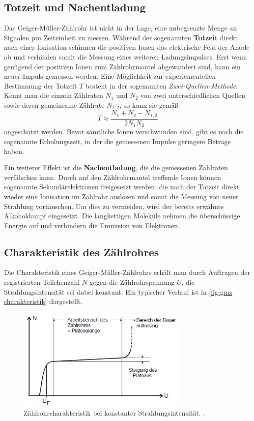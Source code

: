 \subsection{Totzeit und Nachentladung}
\label{sec:Totzeit}
Das Geiger-Müller-Zählrohr ist nicht in der Lage, eine unbegrenzte Menge an Signalen pro Zeiteinheit zu messen.
Während der sogenannten \textbf{Totzeit} direkt nach einer Ionisation schirmen die positiven Ionen das elektrische Feld der Anode ab
und verhinden somit die Messung eines weiteren Ladungsimpulses.
Erst wenn genügend der positiven Ionen zum Zählrohrmantel abgewandert sind, kann ein neuer Impuls gemessen werden.
Eine Möglichkeit zur experiementellen Bestimmung der Totzeit $T$ besteht in der sogenannten \textit{Zwei-Quellen-Methode}.
Kennt man die einzeln Zählraten $N_1$ und $N_2$ von zwei unterschiedlichen Quellen sowie deren gemeinsame
Zählrate $N_{1,2}$, so kann sie gemäß
\begin{equation}
    \label{eq:2 Quellen}
    T \approx \frac{N_1 + N_2 - N_{1,2}}{2N_1 N_2}
\end{equation}
angeschätzt werden.
Bevor sämtliche Ionen verschwunden sind, gibt es noch die sogenannte Erholungszeit, in der die gemessenen Impulse
geringere Beträge haben.

Ein weiterer Effekt ist die \textbf{Nachentladung}, die die gemessenen Zählraten verfälschen kann.
Durch auf den Zählrohrmantel treffende Ionen können sogenannte Sekundärelektronen freigesetzt werden, die
nach der Totzeit direkt wieder eine Ionisation im Zählrohr auslösen und somit die Messung von neuer Strahlung vortäuschen.
Um dies zu vermeiden, wird der bereits erwähnte Alkoholdampf eingesetzt. Die langkettigen Moleküle nehmen
die überschüssige Energie auf und verhindern die Emmision von Elektronen.

\subsection{Charakteristik des Zählrohres}
Die Charakteristik eines Geiger-Müller-Zählrohrs erhält man durch Auftragen der registrierten Teilchenzahl $N$
gegen die Zählrohrspannung $U$, die Strahlungsintensität sei dabei konstant. Ein typischer Verlauf ist
in \autoref{fig:gmz charakteristik} dargestellt.

\begin{figure}[H]
    \centering
    \includegraphics[height=5cm]{content/pics/charakteristik.jpg}
    \caption{Zählrohrcharakteristik bei konstanter Strahlungsintensität. \cite{v703}.}
    \label{fig:gmz charakteristik}
\end{figure}


